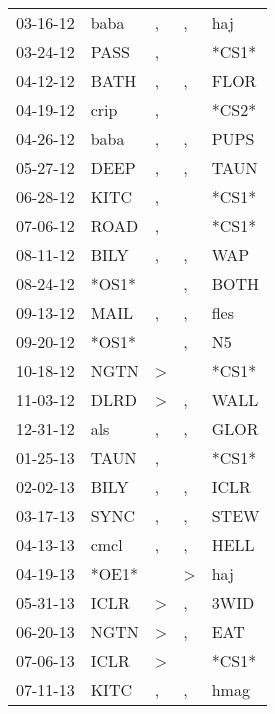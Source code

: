 \begin{supertabular}{lllll}
 03-16-12 &   baba &                , &                , &    haj \\
 03-24-12 &   PASS &                , &                  &  *CS1* \\
 04-12-12 &   BATH &                , &                , &   FLOR \\
 04-19-12 &   crip &                , &                  &  *CS2* \\
 04-26-12 &   baba &                , &                , &   PUPS \\
 05-27-12 &   DEEP &                , &                , &   TAUN \\
 06-28-12 &   KITC &                , &                  &  *CS1* \\
 07-06-12 &   ROAD &                , &                  &  *CS1* \\
 08-11-12 &   BILY &                , &                , &    WAP \\
 08-24-12 &  *OS1* &                  &                , &   BOTH \\
 09-13-12 &   MAIL &                , &                , &   fles \\
 09-20-12 &  *OS1* &                  &                , &     N5 \\
 10-18-12 &   NGTN &     \textgreater &                  &  *CS1* \\
 11-03-12 &   DLRD &     \textgreater &                , &   WALL \\
 12-31-12 &    als &                , &                , &   GLOR \\
 01-25-13 &   TAUN &                , &                  &  *CS1* \\
 02-02-13 &   BILY &                , &                , &   ICLR \\
 03-17-13 &   SYNC &                , &                , &   STEW \\
 04-13-13 &   cmcl &                , &                , &   HELL \\
 04-19-13 &  *OE1* &                  &     \textgreater &    haj \\
 05-31-13 &   ICLR &     \textgreater &                , &   3WID \\
 06-20-13 &   NGTN &     \textgreater &                , &    EAT \\
 07-06-13 &   ICLR &     \textgreater &                  &  *CS1* \\
 07-11-13 &   KITC &                , &                , &   hmag \\

\end{supertabular}
